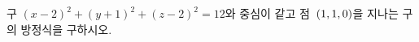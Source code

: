 구 $(x-2)^2+(y+1)^2+(z-2)^2=12$와 중심이 같고 점~$(1{,}\mkern3mu\mathopen{}1{,}\mkern3mu\mathopen{}0)$을 지나는 구의 방정식을 구하시오.
